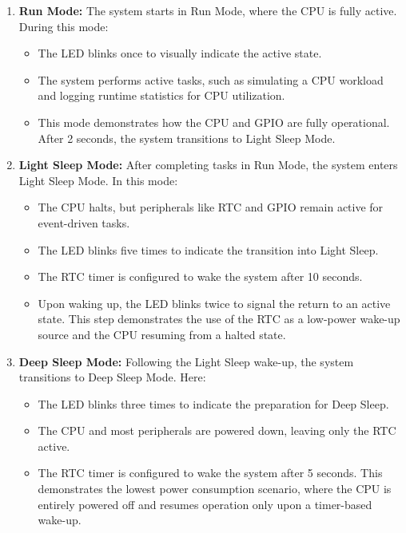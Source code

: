 \documentclass[a4paper, 11pt]{article}
\begin{document}
    \begin{enumerate}
        \item \textbf{Run Mode:}
        The system starts in Run Mode, where the CPU is fully active. During this mode:
        \begin{itemize}
            \item The LED blinks once to visually indicate the active state.
            \item The system performs active tasks, such as simulating a CPU workload and logging runtime statistics for CPU utilization.
            \item This mode demonstrates how the CPU and GPIO are fully operational. After 2 seconds, the system transitions to Light Sleep Mode.
        \end{itemize}
    
        \item \textbf{Light Sleep Mode:}
        After completing tasks in Run Mode, the system enters Light Sleep Mode. In this mode:
        \begin{itemize}
            \item The CPU halts, but peripherals like RTC and GPIO remain active for event-driven tasks.
            \item The LED blinks five times to indicate the transition into Light Sleep.
            \item The RTC timer is configured to wake the system after 10 seconds.
            \item Upon waking up, the LED blinks twice to signal the return to an active state. This step demonstrates the use of the RTC as a low-power wake-up source and the CPU resuming from a halted state.
        \end{itemize}
    
        \item \textbf{Deep Sleep Mode:}
        Following the Light Sleep wake-up, the system transitions to Deep Sleep Mode. Here:
        \begin{itemize}
            \item The LED blinks three times to indicate the preparation for Deep Sleep.
            \item The CPU and most peripherals are powered down, leaving only the RTC active.
            \item The RTC timer is configured to wake the system after 5 seconds. This demonstrates the lowest power consumption scenario, where the CPU is entirely powered off and resumes operation only upon a timer-based wake-up.
        \end{itemize}
    \end{enumerate}
\end{document}
